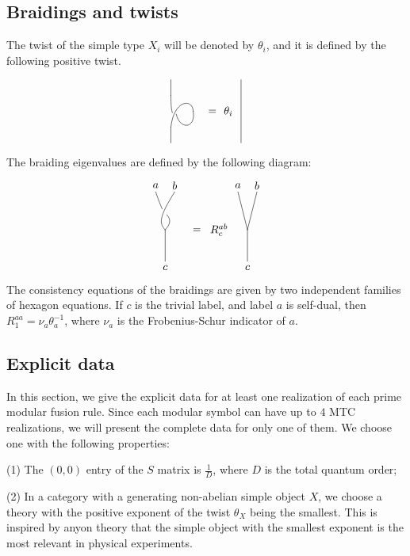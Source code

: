 \documentclass[12pt,psamsfonts]{amsart}
\numberwithin{equation}{section}
\theoremstyle{definition}
\begin{document}
\subsection{Braidings and twists}

The twist of the simple type $X_i$ will be denoted by $\theta_i$,
and it is defined by the following positive twist.

\[ \xy
(0,10)*{}="T"; (0,-10)*{}="B"; (0,5)*{}="T'"; (0,-5)*{}="B'";
"T";"T'" **\dir{-}; "B";"B'" **\dir{-}; (7,0)*{}="LB"; "B'";"LB"
**\crv{(1,4) & (7,4)}; \POS?(.25)*{\hole}="2z"; "LB"; "2z"
**\crv{(8,-6) & (2,-6)}; "2z"; "T'" **\crv{(0,-3)}; (12,0)*{}="S";
(14,0)*{}="S'"; "S";"S'" **\dir2{-}; (18,0)*{\theta_i};
(22,10)*{}="U"; (22,-10)*{}="V"; "U";"V" **\dir{-};
\endxy \]

The braiding eigenvalues are defined by the following diagram:

\[ \xy
(0,12)*{}="A"; (6,12)*{}="B"; (3,0)*{}="V"; (3,-10)*{}="C";
"V";"C" **\dir{-}; "V";"B" **\crv{(1,2) & (1,4)};
\POS?(.65)*{\hole}="2z"; "V";"2z" **\crv{(5,2) & (5,4)}; "2z";"A"
**\crv{(3,5) & (2,6)}; (0,14)*{a};(6,14)*{b};(3,-12)*{c};
(12,0)*{}="S"; (14,0)*{}="S'"; "S";"S'" **\dir2{-};
(20,0)*{R_c^{ab}}; (26,12)*{}="A'"; (32,12)*{}="B'";
(29,0)*{}="V'"; (29,-10)*{}="C'"; "V'";"C'" **\dir{-}; "V'";"A'"
**\dir{-}; "V'";"B'" **\dir{-};
(26,14)*{a};(32,14)*{b};(29,-12)*{c};
\endxy \]

The consistency equations of the braidings are given by two
independent families of hexagon equations.  If $c$ is the trivial
label, and label $a$ is self-dual, then
$R_{1}^{aa}=\nu_a\theta_a^{-1}$, where $\nu_a$ is the
Frobenius-Schur indicator of $a$.

\subsection{Explicit data}\label{explicitdata}

In this section, we give the explicit data for at least one
realization of each prime modular fusion rule.  Since each modular
symbol can have up to $4$ MTC realizations, we will present the
complete data for only one of them. We choose one with the
following properties:

(1) The $(0,0)$ entry of the $S$ matrix is $\frac{1}{D}$, where
$D$ is the total quantum order;

(2) In a category with a generating non-abelian simple object $X$,
we choose a theory with the positive exponent of the twist
$\theta_X$ being the smallest. This is inspired by anyon theory
that the simple object with the smallest exponent is the most
relevant in physical experiments.
\end{document}
